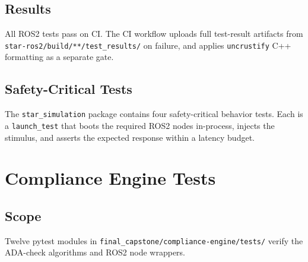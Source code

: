 \documentclass[11pt,letterpaper]{article}
\begin{document}
\subsection{Results}
All ROS2 tests pass on CI. The CI workflow uploads full test-result
artifacts from \texttt{star-ros2/build/**/test\_results/} on failure,
and applies \texttt{uncrustify} C++ formatting as a separate gate.

\subsection{Safety-Critical Tests}
The \texttt{star\_simulation} package contains four safety-critical
behavior tests. Each is a \texttt{launch\_test} that boots the
required ROS2 nodes in-process, injects the stimulus, and asserts the
expected response within a latency budget.

\section{Compliance Engine Tests}
\label{sec:comp}

\subsection{Scope}
Twelve pytest modules in
\texttt{final\_capstone/compliance-engine/tests/} verify the
ADA-check algorithms and ROS2 node wrappers.
\end{document}
